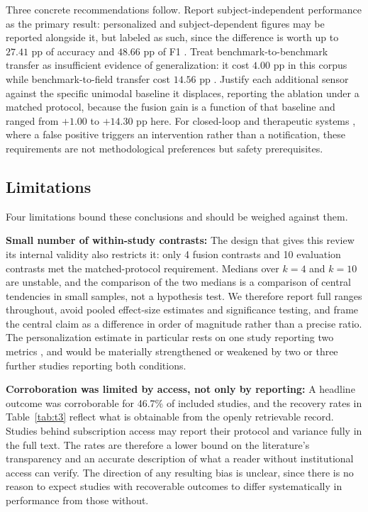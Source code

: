 \documentclass[11pt,a4paper]{article}
\begin{document}
Three concrete recommendations follow. Report subject-independent performance as the
primary result: personalized and subject-dependent figures may be reported alongside it, but
labeled as such, since the difference is worth up to $27.41$ pp of accuracy and $48.66$ pp
of F1 \cite{r33}. Treat benchmark-to-benchmark transfer as insufficient evidence of
generalization: it cost $4.00$ pp in this corpus while benchmark-to-field transfer cost
$14.56$ pp \cite{r49,r55,r61}. Justify each additional sensor against the specific
unimodal baseline it displaces, reporting the ablation under a matched protocol, because the
fusion gain is a function of that baseline and ranged from $+1.00$ to $+14.30$ pp here.
For closed-loop and therapeutic systems \cite{r38,r108}, where a false positive triggers an
intervention rather than a notification, these requirements are not methodological
preferences but safety prerequisites.

\subsection{Limitations}
Four limitations bound these conclusions and should be weighed against them.

\textbf{Small number of within-study contrasts:} The design that gives this review its
internal validity also restricts it: only 4 fusion contrasts and 10 evaluation contrasts met
the matched-protocol requirement. Medians over $k=4$ and $k=10$ are unstable, and the
comparison of the two medians is a comparison of central tendencies in small samples, not a
hypothesis test. We therefore report full ranges throughout, avoid pooled effect-size
estimates and significance testing, and frame the central claim as a difference in order of
magnitude rather than a precise ratio. The personalization estimate in particular rests on
one study reporting two metrics \cite{r33}, and would be materially strengthened or weakened
by two or three further studies reporting both conditions.

\textbf{Corroboration was limited by access, not only by reporting:} A headline outcome was
corroborable for 46.7\% of included studies, and the recovery rates in
Table~\ref{tab:t3} reflect what is obtainable from the openly retrievable record. Studies
behind subscription access may report their protocol and variance fully in the full text.
The rates are therefore a lower bound on the literature's transparency and an accurate
description of what a reader without institutional access can verify. The direction of any
resulting bias is unclear, since there is no reason to expect studies with recoverable
outcomes to differ systematically in performance from those without.
\end{document}
